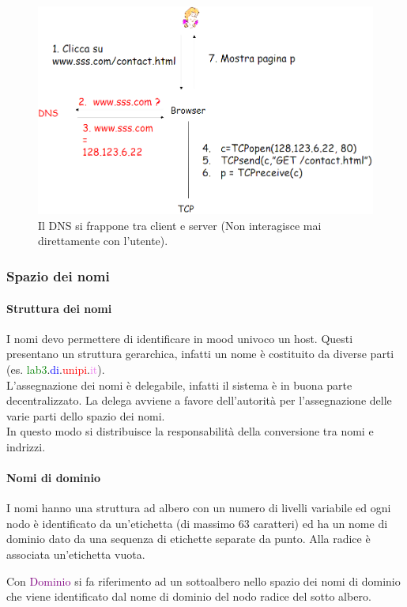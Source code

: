 \begin{figure}[h]
    \centering
    \includegraphics[scale=0.45]{Immagini/PosizionamentoDNS.png}
    \caption{Il DNS si frappone tra client e server (Non interagisce mai direttamente con l'utente).}
\end{figure}

\subsubsection{Spazio dei nomi}
\paragraph{Struttura dei nomi} I nomi devo permettere di identificare in mood univoco un host. Questi presentano un struttura gerarchica, infatti un nome è costituito da diverse parti (es. \textcolor{green}{lab3}.\textcolor{blue}{di}.\textcolor{red}{unipi}.\textcolor{violet}{it}).
\\L'assegnazione dei nomi è delegabile, infatti il sistema è in buona parte decentralizzato. La delega avviene a favore dell'autorità per l’assegnazione delle varie parti dello spazio dei nomi.
\\In questo modo si distribuisce la responsabilità della conversione tra nomi e indrizzi.
\paragraph{Nomi di dominio} I nomi hanno una struttura ad albero con un numero di livelli variabile ed ogni nodo è identificato da un'etichetta (di massimo 63 caratteri) ed ha un nome di dominio dato da una sequenza di etichette separate da punto. Alla radice è associata un'etichetta vuota.
\begin{definition}[Dominio] 
    Con \textcolor{purple}{Dominio} si fa riferimento ad un sottoalbero nello spazio dei nomi di dominio che viene identificato dal nome di dominio del nodo radice del sotto albero.
\end{definition}

